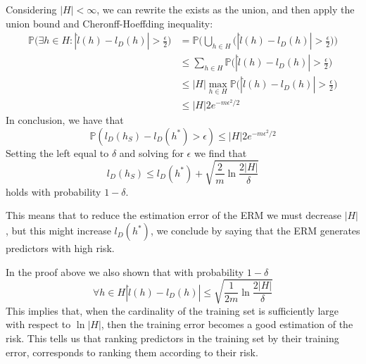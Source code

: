 Considering $|H| < \infty$, we can rewrite the exists as the union, and then apply 
the union bound and Cheronff-Hoeffding inequality:
\begin{equation}
    \begin{aligned}
        \mathbb{P}\bigg(\exists h \in H: |\hat{l}(h) - l_D(h)| > \frac{\epsilon}{2}\bigg)
        &= \mathbb{P}\bigg(\bigcup_{h \in H}\bigg(|\hat{l}(h) - l_D(h)| > \frac{\epsilon}{2}\bigg)\bigg)\\
        &\leq \sum_{h\in H}\mathbb{P}\bigg(|\hat{l}(h) - l_D(h)| > \frac{\epsilon}{2}\bigg)\\
        &\leq |H|\max_{h\in H}\mathbb{P}\bigg(|\hat{l}(h) - l_D(h)| > \frac{\epsilon}{2}\bigg)\\
        &\leq |H|2e^{-m\epsilon^2/2}
    \end{aligned}
\end{equation}
In conclusion, we have that 
$$\mathbb{P}(l_D(h_S) - l_D(h^*) > \epsilon) \leq |H|2e^{-m\epsilon^2/2}$$
Setting the left equal to $\delta$ and solving for $\epsilon$ we find that  
$$l_D(h_S) \leq l_D(h^*) + \sqrt{\frac{2}{m}\ln \frac{2|H|}{\delta}}$$
holds with probability $1-\delta$.

This means that to reduce the estimation error of the ERM we must decrease 
$|H|$, but this might increase $l_D(h^*)$, we conclude by saying that the ERM 
generates predictors with high risk.

In the proof above we also shown that with probability $1-\delta$
$$\forall h \in H |\hat{l}(h) - l_D(h)| \leq \sqrt{\frac{1}{2m}\ln\frac{2|H|}{\delta}}$$
This implies that, when the cardinality of the training set is sufficiently large with respect to 
$\ln|H|$, then the training error becomes a good estimation of the risk.
This tells us that ranking predictors in the training set by their training error, 
corresponds to ranking them according to their risk.




